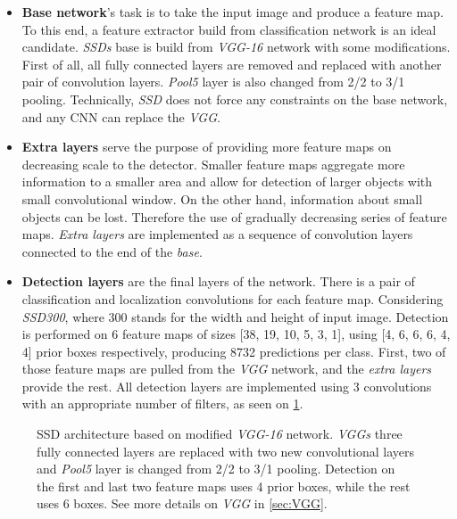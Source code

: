 \begin{itemize}
    \item \textbf{Base network}'s task is to take the input image and produce a feature map. To this end, a feature extractor build from classification network is an ideal candidate. \textit{SSDs} base is build from \textit{VGG-16} network with some modifications. First of all, all fully connected layers are removed and replaced with another pair of convolution layers. \textit{Pool5} layer is also changed from 2/2 to 3/1 pooling. Technically, \textit{SSD} does not force any constraints on the base network, and any CNN can replace the \textit{VGG}.
    \item \textbf{Extra layers} serve the purpose of providing more feature maps on decreasing scale to the detector. Smaller feature maps aggregate more information to a smaller area and allow for detection of larger objects with small convolutional window. On the other hand, information about small objects can be lost. Therefore the use of gradually decreasing series of feature maps. \textit{Extra layers} are implemented as a sequence of convolution layers connected to the end of the \textit{base}.
    \item \textbf{Detection layers} are the final layers of the network. There is a pair of classification and localization convolutions for each feature map. Considering \textit{SSD300}, where 300 stands for the width and height of input image. Detection is performed on 6 feature maps of sizes [38, 19, 10, 5, 3, 1], using [4, 6, 6, 6, 4, 4] prior boxes respectively, producing 8732 predictions per class. First, two of those feature maps are pulled from the \textit{VGG} network, and the \textit{extra layers} provide the rest. All detection layers are implemented using 3 convolutions with an appropriate number of filters, as seen on \cref{fig:VGGSSD}.
\end{itemize}

\begin{figure}
    \centering
    \VGGSSD
    \caption[SSD architecture]%
    {SSD architecture based on modified \textit{VGG-16} network. \textit{VGGs} three fully connected layers are replaced with two new convolutional layers and \textit{Pool5} layer is changed from 2/2 to 3/1 pooling. Detection on the first and last two feature maps uses 4 prior boxes, while the rest uses 6 boxes. See more details on \textit{VGG} in \cref{sec:VGG}.}
    \label{fig:VGGSSD}
\end{figure}


